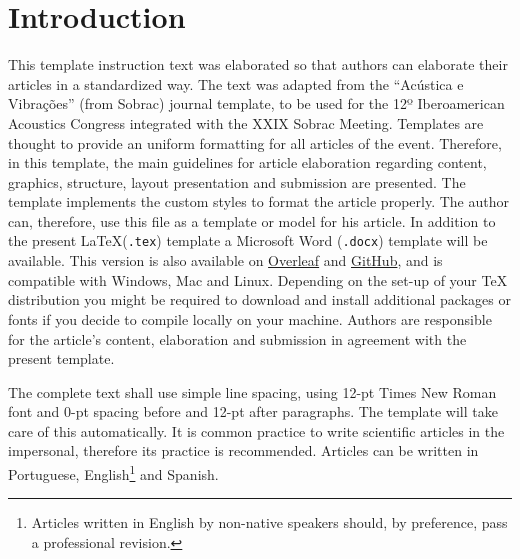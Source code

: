 \documentclass[12pt, a4paper, twoside, twocolumn]{article}
\begin{document}
 \setcounter{page}{1} 
\clearpage %

\section{Introduction}

This template instruction text was elaborated so that authors can elaborate their articles in a standardized way. The text was adapted from the ``Acústica e Vibrações'' (from Sobrac) journal template, to be used for the 12º Iberoamerican Acoustics Congress integrated with the XXIX Sobrac Meeting. Templates are thought to provide an uniform formatting for all articles of the event. Therefore, in this template, the main guidelines for article elaboration regarding content, graphics, structure, layout presentation and submission are presented. The template implements the custom styles to format the article properly. The author can, therefore, use this file as a template or model for his article. In addition to the present \LaTeX\xspace (\texttt{.tex}) template a  Microsoft Word (\texttt{.docx}) template will be available. This version is also available on \href{https://www.overleaf.com/read/hgryywpgmxdx}{Overleaf} and \href{https://github.com/willdfonseca/fia2020}{GitHub}, and is compatible with Windows, Mac and Linux. Depending on the set-up of your TeX distribution you might be required to download and install additional packages or fonts if you decide to compile locally on your machine. 
Authors are responsible for the article's content, elaboration and submission in agreement with the present template.

The complete text shall use simple line spacing, using 12-pt Times New Roman font and 0-pt spacing before and 12-pt after paragraphs. The template will take care of this automatically. 
It is common practice to write scientific articles in the impersonal, therefore its practice is recommended. Articles can be written in Portuguese, English\footnote{Articles written in English by non-native speakers should, by preference, pass a professional revision.} and Spanish.
\end{document}
